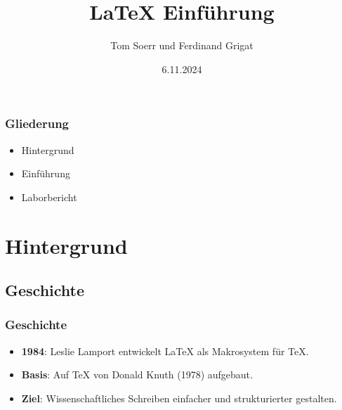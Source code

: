 \documentclass[aspectratio=169]{beamer}
\title{LaTeX Einführung}
\author{Tom Soerr und Ferdinand Grigat}
\date{6.11.2024}
\begin{document}


\begin{frame}
  
\thispagestyle{empty}
\end{frame}






\frame{\titlepage}

\begin{frame}
\frametitle{Gliederung}

\begin{itemize}
  \item Hintergrund
  \item Einführung
  \item Laborbericht
\end{itemize}


\end{frame}



\section{Hintergrund}

\subsection{Geschichte}
\begin{frame}
\frametitle{Geschichte}

\begin{itemize}
\item \textbf{1984}: Leslie Lamport entwickelt LaTeX als Makrosystem für TeX.
\item \textbf{Basis}: Auf TeX von Donald Knuth (1978) aufgebaut.
\item \textbf{Ziel}: Wissenschaftliches Schreiben einfacher und strukturierter gestalten.
\end{itemize}

\end{frame}
\end{document}
